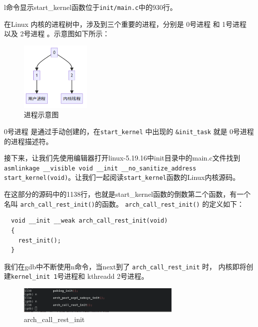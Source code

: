 \documentclass[lang=cn,10pt]{elegantbook}
\begin{document}
l命令显示start\_kernel函数位于\lstinline{init/main.c}中的930行。

在Linux 内核的进程树中，涉及到三个重要的进程，分别是 0号进程 和 1号进程 以及 2号进程 。示意图如下所示：

\begin{figure}[htbp]
  \centering
  \includegraphics[width=0.3\textwidth]{image/jc.png}
  \caption{进程示意图}
\end{figure}

\newpage
0号进程 是通过手动创建的，在\lstinline{start_kernel} 中出现的 \lstinline{&init_task} 就是 0号进程 的进程描述符。

接下来，让我们先使用编辑器打开linux-5.19.16中init目录中的main.c文件找到\lstinline{asmlinkage __visible void __init __no_sanitize_address start_kernel(void)}。让我们一起阅读\lstinline{start_kernel}函数的Linux内核源码。

在这部分的源码中的1138行，也就是start\_kernel函数的倒数第二个函数，有一个名叫 \lstinline{arch_call_rest_init()}的函数。 \lstinline{arch_call_rest_init()} 的定义如下：

\begin{lstlisting}
  void __init __weak arch_call_rest_init(void)
  {
    rest_init();
  }
\end{lstlisting}

我们在gdb中不断使用n命令，当next到了 \lstinline{arch_call_rest_init} 时， 内核即将创建\lstinline{kernel_init 1}号进程和 kthreadd 2号进程。
\begin{figure}[htbp]
  \centering
  \includegraphics[width=0.7\textwidth]{image/image-20231105113449231.png}
  \caption{arch\_call\_rest\_init}
\end{figure}
\end{document}
